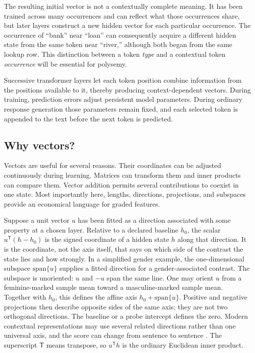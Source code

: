 \documentclass[
  aps,
  reprint,
  superscriptaddress,
  floatfix,
  nofootinbib,
  longbibliography
]{revtex4-2}
\newcommand{\T}{^{\mathsf T}}
\begin{document}
The resulting initial vector is not a contextually complete meaning.  It has
been trained across many occurrences and can reflect what those occurrences
share, but later layers construct a new hidden vector for each particular
occurrence.  The occurrence of ``bank'' near ``loan'' can consequently acquire
a different hidden state from the same token near ``river,'' although both
began from the same lookup row.  This distinction between a token \emph{type}
and a contextual token \emph{occurrence} will be essential for polysemy.

Successive transformer layers let each token position combine information from
the positions available to it, thereby producing context-dependent vectors.
During training, prediction errors adjust persistent model parameters.  During
ordinary response generation those parameters remain fixed, and each selected
token is appended to the text before the next token is predicted.

\subsection{Why vectors?}

Vectors are useful for several reasons.  Their coordinates can be adjusted
continuously during learning.  Matrices can transform them and inner products
can compare them.  Vector addition permits several contributions to coexist
in one state.  Most importantly here, lengths, directions, projections, and
subspaces provide an economical language for graded features.

Suppose a unit vector $u$ has been fitted as a direction associated with some
property at a chosen layer.  Relative to a declared baseline $h_0$, the scalar
$u\T(h-h_0)$ is the signed coordinate of a hidden state $h$ along that
direction.  It is the coordinate, not the axis itself, that says on which side
of the contrast the state lies and how strongly.  In a simplified gender
example, the one-dimensional subspace $\mathrm{span}\{u\}$ supplies a fitted
direction for a gender-associated contrast.  The subspace is unoriented:
$u$ and $-u$ span the same line.  One may orient $u$ from a feminine-marked
sample mean toward a masculine-marked sample mean.  Together with $h_0$, this
defines the affine axis $h_0+\mathrm{span}\{u\}$.  Positive and negative projections then
describe opposite sides of the same axis; they are not two orthogonal
directions.  The baseline or a probe intercept defines the zero.  Modern
contextual representations may use several related directions rather than one
universal axis, and the score can change from sentence to sentence
\cite{bolukbasi2016gender,zhao2019contextualgender}.  The superscript
$\mathsf T$ means transpose, so $u\T h$ is the ordinary Euclidean inner
product.
\end{document}
